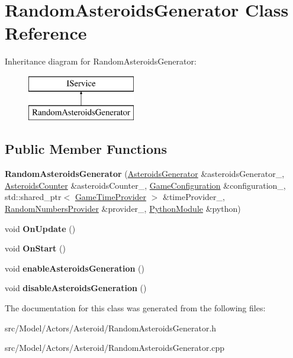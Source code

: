 \hypertarget{classRandomAsteroidsGenerator}{}\section{Random\+Asteroids\+Generator Class Reference}
\label{classRandomAsteroidsGenerator}
Inheritance diagram for Random\+Asteroids\+Generator\+:\begin{figure}[H]
\begin{center}
\leavevmode
\includegraphics[height=2.000000cm]{classRandomAsteroidsGenerator}
\end{center}
\end{figure}
\subsection*{Public Member Functions}
\begin{DoxyCompactItemize}
\item 
{\bfseries Random\+Asteroids\+Generator} (\hyperlink{classAsteroidsGenerator}{Asteroids\+Generator} \&asteroids\+Generator\+\_\+, \hyperlink{classAsteroidsCounter}{Asteroids\+Counter} \&asteroids\+Counter\+\_\+, \hyperlink{classGameConfiguration}{Game\+Configuration} \&configuration\+\_\+, std\+::shared\+\_\+ptr$<$ \hyperlink{classGameTimeProvider}{Game\+Time\+Provider} $>$ \&time\+Provider\+\_\+, \hyperlink{classRandomNumbersProvider}{Random\+Numbers\+Provider} \&provider\+\_\+, \hyperlink{classPythonModule}{Python\+Module} \&python)\hypertarget{classRandomAsteroidsGenerator_aaf62d3a4cbc8363914e67a7693f81eb6}{}\label{classRandomAsteroidsGenerator_aaf62d3a4cbc8363914e67a7693f81eb6}

\item 
void {\bfseries On\+Update} ()\hypertarget{classRandomAsteroidsGenerator_ae4d4f9d4a11084f9773e207a86f72ea8}{}\label{classRandomAsteroidsGenerator_ae4d4f9d4a11084f9773e207a86f72ea8}

\item 
void {\bfseries On\+Start} ()\hypertarget{classRandomAsteroidsGenerator_a4931ec73a8195947f410d371d10da889}{}\label{classRandomAsteroidsGenerator_a4931ec73a8195947f410d371d10da889}

\item 
void {\bfseries enable\+Asteroids\+Generation} ()\hypertarget{classRandomAsteroidsGenerator_abb25c948fec15d29b5a527b2ffe36ca9}{}\label{classRandomAsteroidsGenerator_abb25c948fec15d29b5a527b2ffe36ca9}

\item 
void {\bfseries disable\+Asteroids\+Generation} ()\hypertarget{classRandomAsteroidsGenerator_aa4e4734914589cfbef161d899b98f657}{}\label{classRandomAsteroidsGenerator_aa4e4734914589cfbef161d899b98f657}

\end{DoxyCompactItemize}


The documentation for this class was generated from the following files\+:\begin{DoxyCompactItemize}
\item 
src/\+Model/\+Actors/\+Asteroid/Random\+Asteroids\+Generator.\+h\item 
src/\+Model/\+Actors/\+Asteroid/Random\+Asteroids\+Generator.\+cpp\end{DoxyCompactItemize}
